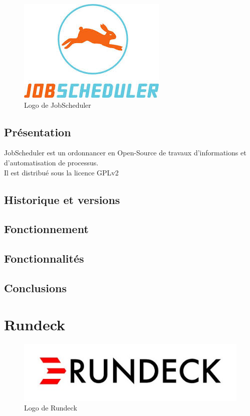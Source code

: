 \documentclass[12pt]{article}
\begin{document}
\begin{figure}[ht]
    \centering
    \includegraphics[scale=0.6]{images/jobscheduler.jpg}
    \caption{Logo de JobScheduler}
\end{figure}

\subsection{Présentation}
JobScheduler est un ordonnancer en Open-Source de travaux d'informations et d'automatisation de processus.
\\
Il est distribué sous la licence GPLv2
\subsection{Historique et versions}

\subsection{Fonctionnement}
\subsection{Fonctionnalités}
\subsection{Conclusions}

\section{Rundeck}

\begin{figure}[ht]
    \includegraphics[scale=0.8]{images/rundeck.jpg}
    \caption{Logo de Rundeck}
\end{figure}
\end{document}
